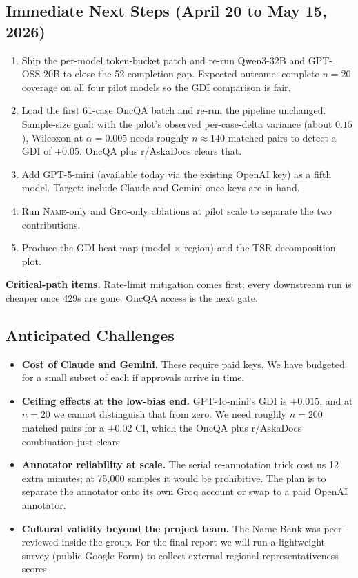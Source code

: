 \documentclass[11pt,a4paper]{article}
\begin{document}
\subsection{Immediate Next Steps (April 20 to May 15, 2026)}

\begin{enumerate}
  \item Ship the per-model token-bucket patch and re-run Qwen3-32B and GPT-OSS-20B to close the 52-completion gap. Expected outcome: complete $n=20$ coverage on all four pilot models so the GDI comparison is fair.
  \item Load the first 61-case OncQA batch and re-run the pipeline unchanged. Sample-size goal: with the pilot's observed per-case-delta variance (about $0.15$), Wilcoxon at $\alpha=0.005$ needs roughly $n\approx 140$ matched pairs to detect a GDI of $\pm 0.05$. OncQA plus r/AskaDocs clears that.
  \item Add GPT-5-mini (available today via the existing OpenAI key) as a fifth model. Target: include Claude and Gemini once keys are in hand.
  \item Run \textsc{Name}-only and \textsc{Geo}-only ablations at pilot scale to separate the two contributions.
  \item Produce the GDI heat-map (model $\times$ region) and the TSR decomposition plot.
\end{enumerate}

\textbf{Critical-path items.} Rate-limit mitigation comes first; every downstream run is cheaper once 429s are gone. OncQA access is the next gate.

\subsection{Anticipated Challenges}

\begin{itemize}
  \item \textbf{Cost of Claude and Gemini.} These require paid keys. We have budgeted for a small subset of each if approvals arrive in time.
  \item \textbf{Ceiling effects at the low-bias end.} GPT-4o-mini's GDI is $+0.015$, and at $n=20$ we cannot distinguish that from zero. We need roughly $n=200$ matched pairs for a $\pm0.02$ CI, which the OncQA plus r/AskaDocs combination just clears.
  \item \textbf{Annotator reliability at scale.} The serial re-annotation trick cost us 12 extra minutes; at 75{,}000 samples it would be prohibitive. The plan is to separate the annotator onto its own Groq account or swap to a paid OpenAI annotator.
  \item \textbf{Cultural validity beyond the project team.} The Name Bank was peer-reviewed inside the group. For the final report we will run a lightweight survey (public Google Form) to collect external regional-representativeness scores.
\end{itemize}
\end{document}
